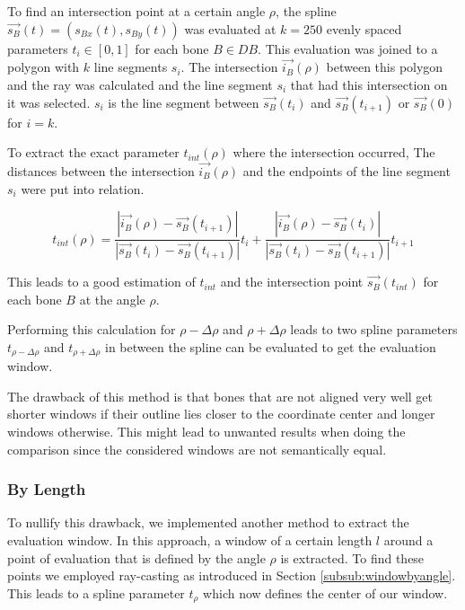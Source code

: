 \documentclass[pdftex,12pt,a4paper]{report}
\begin{document}
To find an intersection point at a certain angle $\rho$, the spline $\vec{s_B}(t) = (s_{Bx}(t), s_{By}(t))$ was evaluated at $k=250$ evenly spaced
parameters $t_i \in [0,1]$ for each bone $B \in DB$. This evaluation was joined to a polygon
with $k$ line segments $s_i$. The intersection $\vec{i_B}(\rho)$ between this polygon and the ray was calculated and
the line segment $s_i$ that had this intersection on it was selected. $s_i$ is the line
segment between $\vec{s_B}(t_i)$ and $\vec{s_B}(t_{i+1})$ or $\vec{s_B}(0)$ for $i=k$.

To extract the exact parameter $t_{int}(\rho)$ where the intersection occurred, The distances
between the intersection $\vec{i_B}(\rho)$ and the endpoints of the line segment $s_i$ were put into relation.

\begin{equation}
t_{int}(\rho) =
\frac{|\vec{i_B}(\rho) - \vec{s_B}(t_{i+1})|}{|\vec{s_B}(t_i) - \vec{s_B}(t_{i+1})|} t_i +
\frac{|\vec{i_B}(\rho) - \vec{s_B}(t_i)|}{|\vec{s_B}(t_i) - \vec{s_B}(t_{i+1})|} t_{i+1}
\end{equation}

This leads to a good estimation of $t_{int}$ and the intersection point $\vec{s_B}(t_{int})$
for each bone $B$ at the angle $\rho$.

Performing this calculation for $\rho-\Delta\rho$ and $\rho+\Delta\rho$ leads to two spline
parameters $t_{\rho-\Delta\rho}$ and $t_{\rho+\Delta\rho}$ in between the spline can be 
evaluated to get the evaluation window.

The drawback of this method is that bones that are not aligned very well get shorter windows
if their outline lies closer to the coordinate center and longer windows otherwise. This 
might lead to unwanted results when doing the comparison since the considered windows are
not semantically equal. 

\subsubsection{By Length}

To nullify this drawback, we implemented another method to extract the evaluation window.
In this approach, a window of a certain length $l$ around a point of evaluation that is defined by the angle $\rho$ is extracted. To find these points we employed ray-casting
as introduced in Section \ref{subsub:windowbyangle}. This leads to a spline parameter
$t_\rho$ which now defines the center of our window.
\end{document}
